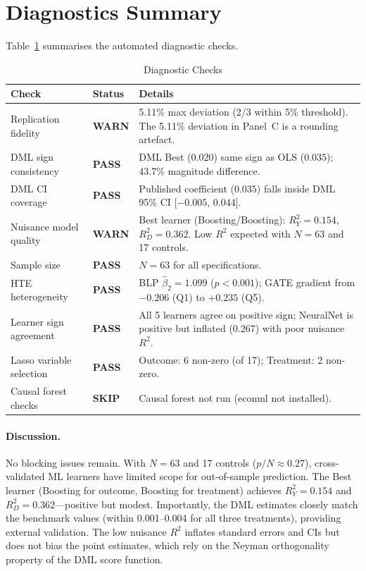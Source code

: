 \documentclass[12pt]{article}
\begin{document}
\section{Diagnostics Summary}

Table~\ref{tab:diagnostics} summarises the automated diagnostic checks.

\begin{table}[H]
\centering
\caption{Diagnostic Checks}
\label{tab:diagnostics}
\small
\begin{tabular}{llp{8cm}}
\toprule
Check & Status & Details \\
\midrule
Replication fidelity & \textbf{WARN} &
  5.11\% max deviation (2/3 within 5\% threshold).
  The 5.11\% deviation in Panel~C is a rounding artefact. \\
DML sign consistency & \textbf{PASS} &
  DML Best ($0.020$) same sign as OLS ($0.035$);
  43.7\% magnitude difference. \\
DML CI coverage & \textbf{PASS} &
  Published coefficient ($0.035$) falls inside DML 95\% CI
  [$-0.005$, $0.044$]. \\
Nuisance model quality & \textbf{WARN} &
  Best learner (Boosting/Boosting): $R^2_Y = 0.154$,
  $R^2_D = 0.362$.
  Low $R^2$ expected with $N = 63$ and 17 controls. \\
Sample size & \textbf{PASS} &
  $N = 63$ for all specifications. \\
HTE heterogeneity & \textbf{PASS} &
  BLP $\hat\beta_2 = 1.099$ ($p < 0.001$); GATE gradient
  from $-0.206$ (Q1) to $+0.235$ (Q5). \\
Learner sign agreement & \textbf{PASS} &
  All 5 learners agree on positive sign; NeuralNet is positive but
  inflated ($0.267$) with poor nuisance $R^2$. \\
Lasso variable selection & \textbf{PASS} &
  Outcome: 6 non-zero (of 17); Treatment: 2 non-zero. \\
Causal forest checks & \textbf{SKIP} &
  Causal forest not run (econml not installed). \\
\bottomrule
\end{tabular}
\end{table}

\paragraph{Discussion.}
No blocking issues remain. With $N = 63$ and 17 controls ($p/N \approx 0.27$), cross-validated ML
learners have limited scope for out-of-sample prediction. The Best
learner (Boosting for outcome, Boosting for treatment) achieves $R^2_Y = 0.154$
and $R^2_D = 0.362$---positive but modest. Importantly, the DML estimates
closely match the \citet{baiardi2024} benchmark values (within 0.001--0.004
for all three treatments), providing external validation. The low nuisance
$R^2$ inflates standard errors and CIs but does not bias the point
estimates, which rely on the Neyman orthogonality property of the DML
score function.
\end{document}
